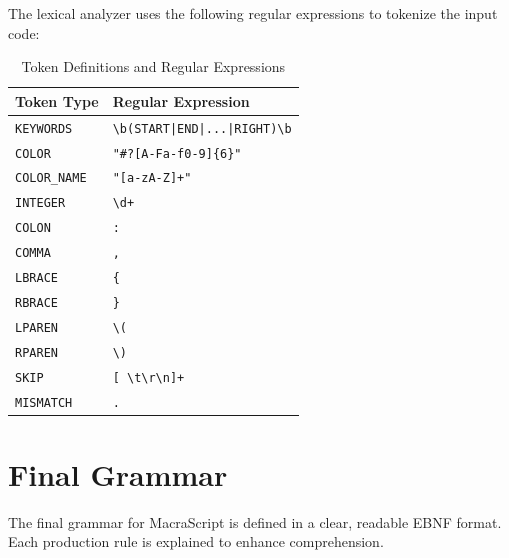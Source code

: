 \documentclass[12pt,a4paper]{report}
\begin{document}
The lexical analyzer uses the following regular expressions to tokenize the input code:

\begin{table}[H]
    \centering
    \caption{Token Definitions and Regular Expressions}
    \label{tab:tokens}
    \begin{tabular}{|l|l|}
        \hline
        \textbf{Token Type} & \textbf{Regular Expression} \\
        \hline
        \texttt{KEYWORDS} & \texttt{\textbackslash b(START|END|...|RIGHT)\textbackslash b} \\
        \texttt{COLOR} & \texttt{"\#?[A-Fa-f0-9]\{6\}"} \\
        \texttt{COLOR\_NAME} & \texttt{"[a-zA-Z]+"} \\
        \texttt{INTEGER} & \texttt{\textbackslash d+} \\
        \texttt{COLON} & \texttt{:} \\
        \texttt{COMMA} & \texttt{,} \\
        \texttt{LBRACE} & \texttt{\{} \\
        \texttt{RBRACE} & \texttt{\}} \\
        \texttt{LPAREN} & \texttt{\textbackslash(} \\
        \texttt{RPAREN} & \texttt{\textbackslash)} \\
        \texttt{SKIP} & \texttt{[ \textbackslash t\textbackslash r\textbackslash n]+} \\
        \texttt{MISMATCH} & \texttt{.} \\
        \hline
    \end{tabular}
\end{table}

\section{Final Grammar}
The final grammar for MacraScript is defined in a clear, readable EBNF format. Each production rule is explained to enhance comprehension.
\end{document}
